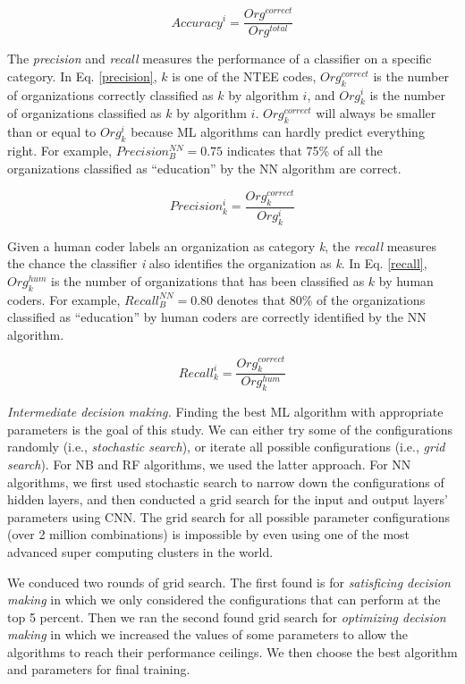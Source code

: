 \documentclass[11pt]{article}
\begin{document}
\begin{equation} \label{accuracy}
    Accuracy^i=\frac{Org^{correct}}{Org^{total}}
\end{equation}

The \textit{precision} and \textit{recall} measures the performance of a classifier on a specific category. In Eq. \ref{precision}, $k$ is one of the NTEE codes, $Org^{correct}_{k}$ is the number of organizations correctly classified as $k$ by algorithm $i$, and ${Org^{i}_{k}}$ is the number of organizations classified as $k$ by algorithm $i$. $Org^{correct}_{k}$ will always be smaller than or equal to ${Org^{i}_{k}}$ because ML algorithms can hardly predict everything right. For example, $Precision^{NN}_{B}=0.75$ indicates that 75\% of all the organizations classified as ``education'' by the NN algorithm are correct.

\begin{equation} \label{precision}
    Precision^{i}_{k}=\frac{Org^{correct}_{k}}{Org^{i}_{k}}
\end{equation}

Given a human coder labels an organization as category \textit{k}, the \textit{recall} measures the chance the classifier \textit{i} also identifies the organization as \textit{k}. In Eq. \ref{recall}, $Org^{hum}_{k}$ is the number of organizations that has been classified as $k$ by human coders. For example, $Recall^{NN}_{B}=0.80$ denotes that 80\% of the organizations classified as ``education'' by human coders are correctly identified by the NN algorithm.

\begin{equation} \label{recall}
    Recall^{i}_{k}=\frac{Org^{correct}_{k}}{Org^{hum}_{k}}
\end{equation}

\textit{Intermediate decision making.} Finding the best ML algorithm with appropriate parameters is the goal of this study. We can either try some of the configurations randomly (i.e., \textit{stochastic search}), or iterate all possible configurations (i.e., \textit{grid search}). For NB and RF algorithms, we used the latter approach. For NN algorithms, we first used stochastic search to narrow down the configurations of hidden layers, and then conducted a grid search for the input and output layers' parameters using CNN. The grid search for all possible parameter configurations (over 2 million combinations) is impossible by even using one of the most advanced super computing clusters in the world.

We conduced two rounds of grid search. The first found is for \textit{satisficing decision making} in which we only considered the configurations that can perform at the top 5 percent. Then we ran the second found grid search for \textit{optimizing decision making} in which we increased the values of some parameters to allow the algorithms to reach their performance ceilings. We then choose the best algorithm and parameters for final training.
\end{document}
